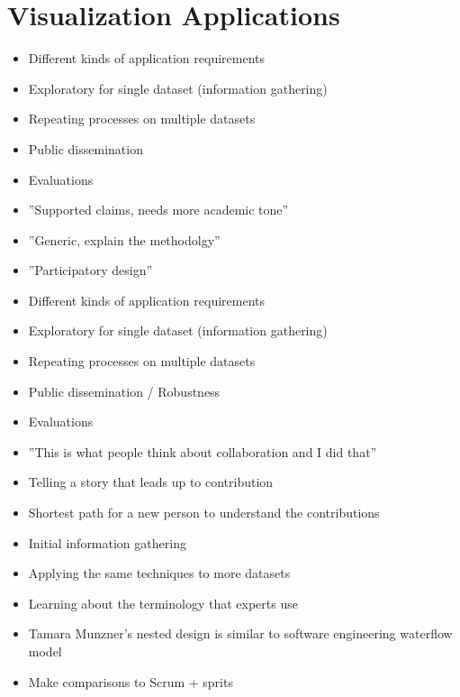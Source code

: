 \chapter{Visualization Applications}
\label{ch:visapp}

\begin{itemize}
\item Different kinds of application requirements
\item Exploratory for single dataset (information gathering)
\item Repeating processes on multiple datasets
\item Public dissemination
\item Evaluations
\end{itemize}

\begin{itemize}
\item ''Supported claims, needs more academic tone''
\item ''Generic, explain the methodolgy''
\item ''Participatory design''
\item Different kinds of application requirements
\item Exploratory for single dataset (information gathering)
\item Repeating processes on multiple datasets
\item Public dissemination / Robustness
\item Evaluations
\item ''This is what people think about collaboration and I did that''
\item Telling a story that leads up to contribution 
\item Shortest path for a new person to understand the contributions

\end{itemize}

\begin{itemize}
\item Initial information gathering
\item Applying the same techniques to more datasets
\item Learning about the terminology that experts use
\end{itemize}

\begin{itemize}
\item Tamara Munzner's nested design is similar to software engineering waterflow model
\item Make comparisons to Scrum + sprits
\end{itemize}
